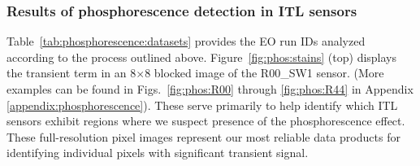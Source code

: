 \subsubsection{Results of phosphorescence detection in ITL sensors}\label{phos-results}

Table~\ref{tab:phosphorescence:datasets} provides the EO run IDs analyzed according to the process outlined above. Figure~\ref{fig:phos:stains} (top) displays the transient term in an 8$\times$8 blocked image of the R00\_SW1 sensor. (More examples can be found in Figs.~\ref{fig:phos:R00} through \ref{fig:phos:R44} in Appendix \ref{appendix:phosphorescence}). These serve primarily to help identify which ITL sensors exhibit regions where we suspect presence of the phosphorescence effect. These full-resolution pixel images represent our most reliable data products for identifying individual pixels with significant transient signal.

